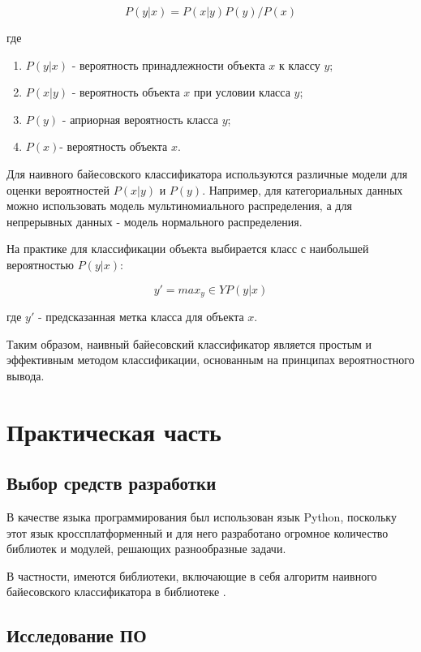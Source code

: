 \documentclass[12pt]{report}
\begin{document}
\begin{equation}
  P(y|x) = P(x|y)P(y)/P(x)  
\end{equation}
    
где 
\begin{enumerate}
    \item $P(y|x)$ - вероятность принадлежности объекта $x$ к классу $y$;
    \item $P(x|y)$ - вероятность объекта $x$ при условии класса $y$;
    \item $P(y)$ - априорная вероятность класса $y$;
    \item $P(x) $- вероятность объекта $x$.
\end{enumerate}

Для наивного байесовского классификатора используются различные модели для оценки вероятностей $P(x|y)$ и $P(y)$. Например, для категориальных данных можно использовать модель мультиномиального распределения, а для непрерывных данных - модель нормального распределения.

На практике для классификации объекта выбирается класс с наибольшей вероятностью $P(y|x)$:

\begin{equation}
    y' = max_y \in Y P(y|x)
\end{equation}

где $y'$ - предсказанная метка класса для объекта $x$.

Таким образом, наивный байесовский классификатор является простым и эффективным методом классификации, основанным на принципах вероятностного вывода.


\chapter{Практическая часть}

\section{Выбор средств разработки}
В качестве языка программирования был использован язык Python, поскольку этот язык кроссплатформенный и для него разработано огромное количество библиотек и модулей, решающих разнообразные задачи. 

В частности, имеются библиотеки, включающие в себя алгоритм наивного байесовского классификатора  в библиотеке \cite{bib:scipy}.

\section{Исследование ПО}
\end{document}
